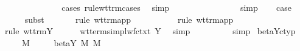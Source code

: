 \begin{isabellebody}
\ {}{\isacharparenleft}{}{\isacharparenright}\ \isamarkupfalse%
\ {\isachardoublequoteopen}{\isasympi}\ {\isasymrightarrow}\ {\isasymsigma}\ {\isacharequal}\ {\isacharparenleft}{\isasymtau}\ {\isasymrightarrow}\ {\isasymtau}{\isacharparenright}\ {\isasymrightarrow}\ {\isasymtau}{\isachardoublequoteclose}\ \isamarkupfalse%
\ {\isacharparenleft}cases\ rule{\isacharcolon}wt{\isacharunderscore}trm{\isachardot}cases{\isacharparenright}\ \isamarkupfalse%
\ simp\isanewline
\ \ \isamarkupfalse%
\ \isamarkupfalse%
\ {}{\isacharcolon}\ {\isachardoublequoteopen}{\isasympi}\ {\isacharequal}\ {\isasymtau}\ {\isasymrightarrow}\ {\isasymtau}{\isachardoublequoteclose}\ {\isachardoublequoteopen}{\isasymsigma}\ {\isacharequal}\ {\isasymtau}{\isachardoublequoteclose}\ \isamarkupfalse%
\ simp{\isacharplus}\isanewline
\ \ \isamarkupfalse%
\ {\isacharquery}case\isanewline
\ \ \ \ \isamarkupfalse%
\ {\isacharparenleft}subst\ {}{\isacharparenright}\isanewline
\ \ \ \ \isamarkupfalse%
\ {\isacharparenleft}rule\ wt{\isacharunderscore}trm{\isachardot}app{\isacharparenright}\isanewline
\ \ \ \ \isamarkupfalse%
\isanewline
\ \ \ \ \isamarkupfalse%
\ {\isacharparenleft}rule\ wt{\isacharunderscore}trm{\isachardot}app{\isacharparenright}\isanewline
\ \ \ \ \isamarkupfalse%
\ {\isacharparenleft}rule\ wt{\isacharunderscore}trm{\isachardot}Y{\isacharparenright}\isanewline
\ \ \ \ \isamarkupfalse%
\ wt{\isacharunderscore}terms{\isacharunderscore}impl{\isacharunderscore}wf{\isacharunderscore}ctxt\ Y\ \isamarkupfalse%
\ simp\isanewline
\ \ \ \ \isamarkupfalse%
\ {}{\isacharparenleft}{}{\isacharparenright}\ {}{\isacharparenleft}{}{\isacharparenright}\ \isamarkupfalse%
\ simp{\isacharplus}\isanewline
{}\isamarkupfalse%
%
\endisatagproof
{\isafoldproof}%
%
\isadelimproof
\isanewline
%
\endisadelimproof
\isanewline
{}\isamarkupfalse%
\ beta{\isacharunderscore}Y{\isacharunderscore}c{\isacharunderscore}typ{\isacharcolon}\isanewline
\ \ \ {\isachardoublequoteopen}{\isasymGamma}\ {\isasymturnstile}\ M\ {\isacharcolon}\ {\isasymsigma}{\isachardoublequoteclose}\isanewline
\ \ \ {\isachardoublequoteopen}beta{\isacharunderscore}Y{\isacharasterisk}\ M\ M{\isacharprime}{\isachardoublequoteclose}\isanewline

\end{isabellebody}
